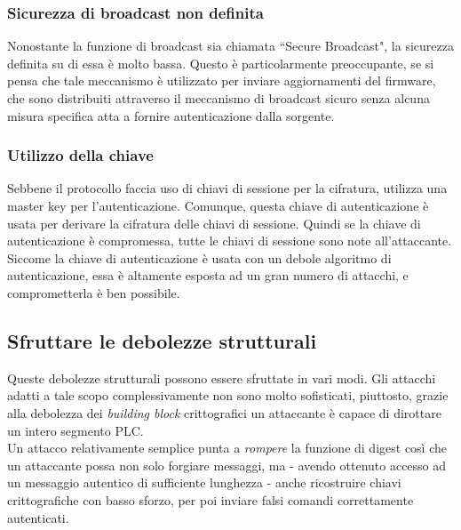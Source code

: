 \subsubsection{Sicurezza di broadcast non definita}
Nonostante la funzione di broadcast sia chiamata ``Secure Broadcast", la sicurezza definita su di essa è molto bassa. Questo è particolarmente preoccupante, se si pensa che tale meccanismo è utilizzato per inviare aggiornamenti del firmware, che sono distribuiti attraverso il meccanismo di broadcast sicuro senza alcuna misura specifica atta a fornire autenticazione dalla sorgente.
\subsubsection{Utilizzo della chiave}
Sebbene il protocollo faccia uso di chiavi di sessione per la cifratura, utilizza una master key per l'autenticazione. Comunque, questa chiave di autenticazione è usata per derivare la cifratura delle chiavi di sessione. Quindi se la chiave di autenticazione è compromessa, tutte le chiavi di sessione sono note all'attaccante. Siccome la chiave di autenticazione è usata con un debole algoritmo di autenticazione, essa è altamente esposta ad un gran numero di attacchi, e comprometterla è ben possibile.
\subsection{Sfruttare le debolezze strutturali}
Queste debolezze strutturali possono essere sfruttate in vari modi. Gli attacchi adatti a tale scopo complessivamente non sono molto sofisticati, piuttosto, grazie alla debolezza dei \emph{building block} crittografici un attaccante è capace di dirottare un intero segmento PLC.\\
Un attacco relativamente semplice punta a \textit{rompere} la funzione di digest così che un attaccante possa non solo forgiare messaggi, ma - avendo ottenuto accesso ad un messaggio autentico di sufficiente lunghezza - anche ricostruire chiavi crittografiche con basso sforzo, per poi inviare falsi comandi correttamente autenticati.
